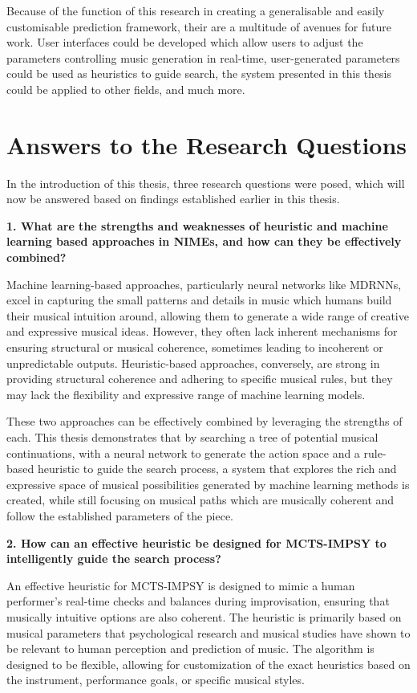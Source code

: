 Because of the function of this research in creating a generalisable and easily customisable prediction framework, their are a multitude of avenues for future work. User interfaces could be developed which allow users to adjust the parameters controlling music generation in real-time, user-generated parameters could be used as heuristics to guide search, the system presented in this thesis could be applied to other fields, and much more.  

\section{Answers to the Research Questions}

In the introduction of this thesis, three research questions were posed, which will now be answered based on findings established earlier in this thesis.

\textbf{1. What are the strengths and weaknesses of heuristic and machine learning based approaches in NIMEs, and how can they be effectively combined?}

Machine learning-based approaches, particularly neural networks like MDRNNs, excel in capturing the small patterns and details in music which humans build their musical intuition around, allowing them to generate a wide range of creative and expressive musical ideas. However, they often lack inherent mechanisms for ensuring structural or musical coherence, sometimes leading to incoherent or unpredictable outputs. Heuristic-based approaches, conversely, are strong in providing structural coherence and adhering to specific musical rules, but they may lack the flexibility and expressive range of machine learning models.

These two approaches can be effectively combined by leveraging the strengths of each. This thesis demonstrates that by searching a tree of potential musical continuations, with a neural network to generate the action space and a rule-based heuristic to guide the search process, a system that explores the rich and expressive space of musical possibilities generated by machine learning methods is created, while still focusing on musical paths which are musically coherent and follow the established parameters of the piece.

\textbf{2. How can an effective heuristic be designed for MCTS-IMPSY to intelligently guide the search process?}

An effective heuristic for MCTS-IMPSY is designed to mimic a human performer's real-time checks and balances during improvisation, ensuring that musically intuitive options are also coherent. The heuristic is primarily based on musical parameters that psychological research and musical studies have shown to be relevant to human perception and prediction of music. The algorithm is designed to be flexible, allowing for customization of the exact heuristics based on the instrument, performance goals, or specific musical styles.

